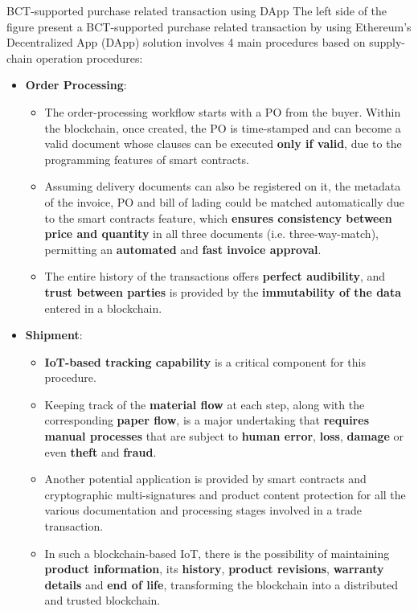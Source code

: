 \documentclass[11pt]{beamer}
\begin{document}
\begin{frame}[allowframebreaks]{BCT-supported purchase related transaction using DApp}
The left side of the figure present a BCT-supported purchase related transaction by using Ethereum’s Decentralized App (DApp) solution involves 4 main procedures based on supply-chain operation procedures:
\begin{itemize}
\item \textbf{Order Processing}:
\begin{itemize}
	\item The order-processing workflow starts with a PO from the buyer. Within the blockchain, once created, the PO is time-stamped and can become a valid document whose clauses can be executed \textbf{only if valid}, due to the programming features of smart contracts.
	\item Assuming delivery documents can also be registered on it, the metadata of the invoice, PO and bill of lading could be matched automatically due to the smart contracts feature, which \textbf{ensures consistency between price and quantity} in all three documents (i.e. three-way-match), permitting an \textbf{automated} and \textbf{fast invoice approval}.
	\item The entire history of the transactions offers \textbf{perfect audibility}, and \textbf{trust between parties} is provided by the \textbf{immutability of the data} entered in a blockchain.
\end{itemize}	  

\item \textbf{Shipment}:
\begin{itemize}
	\item \textbf{IoT-based tracking capability} is a critical component for this procedure.
	\item Keeping track of the \textbf{material flow} at each step, along with the corresponding \textbf{paper flow}, is a major undertaking that \textbf{requires manual processes} that are subject to \textbf{human error}, \textbf{loss}, \textbf{damage} or even \textbf{theft} and \textbf{fraud}.
	\item Another potential application is provided by smart contracts and cryptographic multi-signatures and product content protection for all the various documentation and processing stages involved in a trade transaction.
	\item In such a blockchain-based IoT, there is the possibility of maintaining \textbf{product information}, its \textbf{history}, \textbf{product revisions}, \textbf{warranty details} and \textbf{end of life}, transforming the blockchain into a distributed and trusted blockchain.
\end{itemize}



\end{itemize}
\end{frame}
\end{document}
